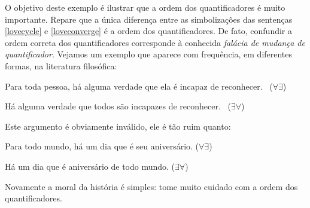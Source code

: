 O objetivo deste exemplo é ilustrar que a ordem dos quantificadores é muito importante.
Repare que a única diferença entre as simbolizações das sentenças \ref{lovecycle} e \ref{loveconverge} é a ordem dos quantificadores.
De fato, confundir a ordem correta dos quantificadores corresponde à conhecida \emph{falácia de mudança de quantificador}.
Vejamos um exemplo que aparece com frequência, em diferentes formas, na literatura filosófica:
	\begin{earg}
		\item[] Para toda pessoa, há alguma verdade que ela é incapaz de reconhecer. \ ($\forall \exists$)
		\item[\therefore] Há alguma verdade que todos são incapazes de reconhecer. \ ($\exists \forall$)
	\end{earg}
Este argumento é obviamente inválido, ele é tão ruim quanto:
	\begin{earg}
		\item[] Para todo mundo, há um dia que é seu aniversário. \hfill ($\forall \exists$)
		\item[\therefore] Há um dia que é aniversário de todo mundo. \hfill ($\exists \forall$)
	\end{earg} 
Novamente a moral da história é simples:
tome muito cuidado com a ordem dos quantificadores.


